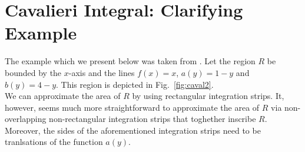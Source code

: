 \documentclass[twoside,reqno,11pt]{fcaa-var} %
\begin{document}
\section{Cavalieri Integral: Clarifying Example}
\label{sec:cav_integral_example}
The example which we present below was taken from \cite{?}. Let the region $R$ be bounded by the $x$-axis and the lines $f(x)=x$, $a(y)=1-y$ and $b(y)=4-y$. This region is depicted in Fig.~\ref{fig:caval2}.\\


We can approximate the area of $R$ by using rectangular integration strips. It, however, seems much more straightforward to approximate the area of $R$ via non-overlapping non-rectangular integration strips that toghether inscribe $R$. Moreover, the sides of the aforementioned integration strips need to be tranlsations of the function $a(y)$. 
\end{document}

